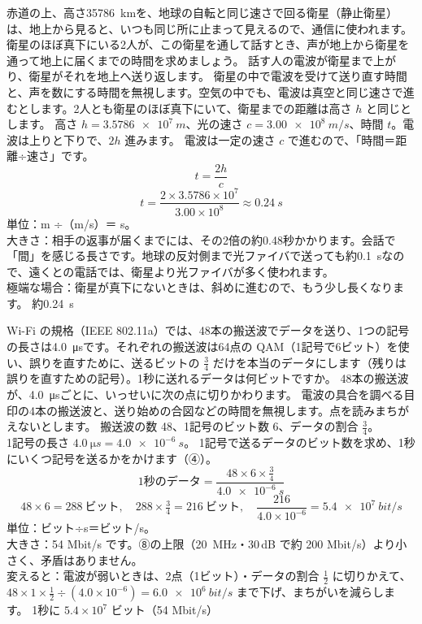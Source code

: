 \begin{phreidai}[静止衛星を使う電話のおくれ]\label{ph:波-14:ex2}
赤道の上、高さ\qty{35786}{km}を、地球の自転と同じ速さで回る衛星（静止衛星）は、地上から見ると、いつも同じ所に止まって見えるので、通信に使われます。衛星のほぼ真下にいる2人が、この衛星を通して話すとき、声が地上から衛星を通って地上に届くまでの時間を求めましょう。
\phbamen
話す人の電波が衛星まで上がり、衛星がそれを地上へ送り返します。
\phmushi
衛星の中で電波を受けて送り直す時間と、声を数にする時間を無視します。空気の中でも、電波は真空と同じ速さで進むとします。2人とも衛星のほぼ真下にいて、衛星までの距離は高さ $h$ と同じとします。
\phzu
高さ $h=\qty{3.5786e7}{m}$、光の速さ $c=\qty{3.00e8}{m/s}$、時間 $t$。電波は上りと下りで、$2h$ 進みます。
\phriyu
電波は一定の速さ $c$ で進むので、「時間＝距離÷速さ」です。
\phtateru
\[t=\frac{2h}{c}\]
\phtoku
\[t=\frac{2\times3.5786\times10^7}{3.00\times10^8}\approx\qty{0.24}{s}\]
\phtashikame
単位：m ÷（m/s）＝ s。\\
大きさ：相手の返事が届くまでには、その2倍の約0.48秒かかります。会話で「間」を感じる長さです。地球の反対側まで光ファイバで送っても約\qty{0.1}{s}なので、遠くとの電話では、衛星より光ファイバが多く使われます。\\
極端な場合：衛星が真下にないときは、斜めに進むので、もう少し長くなります。
\kotae 約\qty{0.24}{s}
\end{phreidai}

\begin{phreidai}[Wi-Fi で1秒に送れるデータ]\label{ph:波-14:ex3}
Wi-Fi の規格（IEEE 802.11a）では、48本の搬送波でデータを送り、1つの記号の長さは\qty{4.0}{\micro s}です。それぞれの搬送波は64点の QAM（1記号で6ビット）を使い、誤りを直すために、送るビットの $\tfrac34$ だけを本当のデータにします（残りは誤りを直すための記号）。1秒に送れるデータは何ビットですか。
\phbamen
48本の搬送波が、\qty{4.0}{\micro s}ごとに、いっせいに次の点に切りかわります。
\phmushi
電波の具合を調べる目印の4本の搬送波と、送り始めの合図などの時間を無視します。点を読みまちがえないとします。
\phzu
搬送波の数 48、1記号のビット数 6、データの割合 $\tfrac34$。\\
1記号の長さ $\qty{4.0}{\micro s}=\qty{4.0e-6}{s}$。
\phriyu
1記号で送るデータのビット数を求め、1秒にいくつ記号を送るかをかけます（④）。
\phtateru
\[\text{1秒のデータ}=\frac{48\times6\times\tfrac34}{\qty{4.0e-6}{s}}\]
\phtoku
\[48\times6=288\ \text{ビット},\quad 288\times\tfrac34=216\ \text{ビット},\quad \frac{216}{4.0\times10^{-6}}=\qty{5.4e7}{bit/s}\]
\phtashikame
単位：ビット÷s＝ビット/s。\\
大きさ：54 Mbit/s です。⑧の上限（\qty{20}{MHz}・30\,dB で約 200 Mbit/s）より小さく、矛盾はありません。\\
変えると：電波が弱いときは、2点（1ビット）・データの割合 $\tfrac12$ に切りかえて、$48\times1\times\tfrac12\div(4.0\times10^{-6})=\qty{6.0e6}{bit/s}$ まで下げ、まちがいを減らします。
\kotae 1秒に $5.4\times10^7$ ビット（54 Mbit/s）
\end{phreidai}

